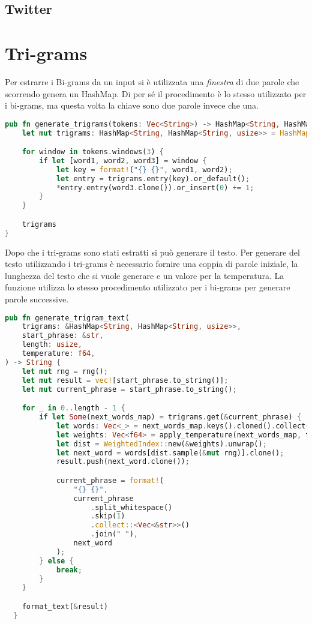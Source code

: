 \subsection{Twitter}

\section{Tri-grams}

Per estrarre i Bi-grams da un input si è utilizzata una \textit{finestra} di due parole che scorrendo genera un HashMap. Di per sé il procedimento è lo stesso utilizzato per i bi-grams, ma questa volta la chiave sono due parole invece che una.

\begin{lstlisting}[language=rust, caption = Estrazione dei tri-grams]
pub fn generate_trigrams(tokens: Vec<String>) -> HashMap<String, HashMap<String, usize>> {
    let mut trigrams: HashMap<String, HashMap<String, usize>> = HashMap::new();

    for window in tokens.windows(3) {
        if let [word1, word2, word3] = window {
            let key = format!("{} {}", word1, word2);
            let entry = trigrams.entry(key).or_default();
            *entry.entry(word3.clone()).or_insert(0) += 1;
        }
    }

    trigrams
}

\end{lstlisting}

Dopo che i tri-grams sono stati estratti si può generare il testo. Per generare del testo utilizzando i tri-grams è necessario fornire una coppia di parole iniziale, la lunghezza del testo che si vuole generare e un valore per la temperatura. La funzione utilizza lo stesso procedimento utilizzato per i bi-grams per generare parole successive. 

\begin{lstlisting}[language=rust, caption = Generazione dei tri-grams]
pub fn generate_trigram_text(
    trigrams: &HashMap<String, HashMap<String, usize>>,
    start_phrase: &str,
    length: usize,
    temperature: f64,
) -> String {
    let mut rng = rng();
    let mut result = vec![start_phrase.to_string()];
    let mut current_phrase = start_phrase.to_string();

    for _ in 0..length - 1 {
        if let Some(next_words_map) = trigrams.get(&current_phrase) {
            let words: Vec<_> = next_words_map.keys().cloned().collect();
            let weights: Vec<f64> = apply_temperature(next_words_map, temperature);
            let dist = WeightedIndex::new(&weights).unwrap();
            let next_word = words[dist.sample(&mut rng)].clone();
            result.push(next_word.clone());

            current_phrase = format!(
                "{} {}",
                current_phrase
                    .split_whitespace()
                    .skip(1)
                    .collect::<Vec<&str>>()
                    .join(" "),
                next_word
            );
        } else {
            break;
        }
    }

    format_text(&result)
  }

\end{lstlisting}

